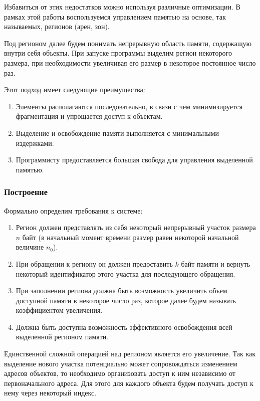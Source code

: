\documentclass[bachelor, och, otchet]{SCWorks}
\begin{document}
Избавиться от этих недостатков можно используя различные оптимизации. В рамках
этой работы воспользуемся управлением памятью на основе, так называемых,
регионов (арен, зон)\cite{WangMemory}.

Под регионом далее будем понимать непрерывную область памяти, содержащую внутри
себя объекты. При запуске программы выделим регион некоторого размера, при
необходимости увеличивая его размер в некоторое постоянное число раз.

Этот подход имеет следующие преимущества:

\begin{enumerate}
    \item Элементы располагаются последовательно, в связи с чем минимизируется
    фрагментация и упрощается доступ к объектам.
    \item Выделение и освобождение памяти выполняется с минимальными издержками.
    \item Программисту предоставляется большая свобода для управления выделенной
    памятью.
\end{enumerate}

\subsubsection{Построение}
Формально определим требования к системе:
\begin{enumerate}
    \item Регион должен представлять из себя некоторый непрерывный участок
    размера $n$ байт (в начальный момент времени размер равен некоторой
    начальной величине $n_0$).
    \item При обращении к региону он должен предоставить $k$ байт памяти и
    вернуть некоторый идентификатор этого участка для последующего обращения.
    \item При заполнении региона должна быть возможность увеличить объем
    доступной памяти в некоторое число раз, которое далее будем называть
    коэффициентом увеличения.
    \item Должна быть доступна возможность эффективного освобождения всей
    выделенной регионом памяти.
\end{enumerate}

Единственной сложной операцией над регионом является его увеличение. Так как
выделение нового участка потенциально может сопровождаться изменением адресов
объектов, то необходимо организовать доступ к ним независимо от первоначального
адреса. Для этого для каждого объекта будем получать доступ к нему через
некоторый индекс.
\end{document}
